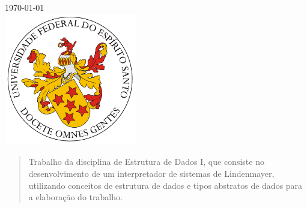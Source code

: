 \documentclass[a4paper,12pt]{article}%
\begin{document}
\begin{titlepage}


{\large \today}\\[2cm] %


\includegraphics[width=58mm]{LogoUfes.png}\\[1cm] %


\vfill %

\end{titlepage}





\begin{abstract}
Trabalho da disciplina de Estrutura de Dados I, que consiste no desenvolvimento 
de um interpretador de sistemas de Lindenmayer, utilizando conceitos de estrutura 
de dados e tipos abstratos de dados para a elaboração do trabalho.
\end{abstract}
\end{document}
